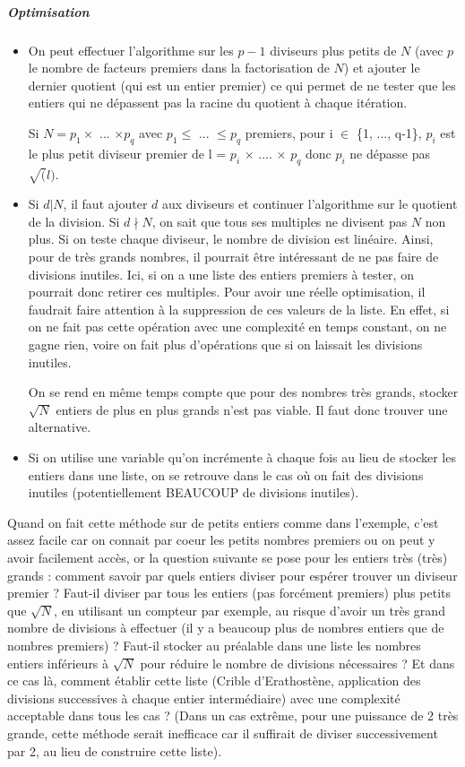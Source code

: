 \documentclass[11pt,a4paper]{article}
\begin{document}
	\subparagraph{Optimisation}
	\begin{itemize}	
		\item On peut effectuer l'algorithme sur les $\mathit{p-1}$ diviseurs plus petits de $\mathit{N}$ (avec $\mathit{p}$ le nombre de facteurs premiers dans la factorisation de $\mathit{N}$) et ajouter le dernier quotient (qui est un entier premier) ce qui permet de ne tester que les entiers qui ne dépassent pas la racine du quotient à chaque itération.
		
		Si $N = p_1 \times$ ... $\times p_q$ avec $p_1 \leq$ ... $\leq p_q$ premiers, pour i $\in$ \{1, ..., q-1\}, $p_i$ est le plus petit diviseur premier de l = $p_i$ $\times$ .... $\times$ $p_q$ donc $p_i$ ne dépasse pas $\sqrt(l)$.
		
		\item Si $\mathit{d|N}$, il faut ajouter $\mathit{d}$ aux diviseurs et continuer l'algorithme sur le quotient de la division. Si $\mathit{d \nmid N}$, on sait que tous ses multiples ne divisent pas $\mathit{N}$ non plus. Si on teste chaque diviseur, le nombre de division est linéaire. Ainsi, pour de très grands nombres, il pourrait être intéressant de ne pas faire de divisions inutiles. Ici, si on a une liste des entiers premiers à tester, on pourrait donc retirer ces multiples. Pour avoir une réelle optimisation, il faudrait faire attention à la suppression de ces valeurs de la liste. En effet, si on ne fait pas cette opération avec une complexité en temps constant, on ne gagne rien, voire on fait plus d'opérations que si on laissait les divisions inutiles. 
		
		On se rend en même temps compte que pour des nombres très grands, stocker $\sqrt{N}$ entiers de plus en plus grands n'est pas viable. Il faut donc trouver une alternative.
		
		\item Si on utilise une variable qu'on incrémente à chaque fois au lieu de stocker les entiers dans une liste, on se retrouve dans le cas où on fait des divisions inutiles (potentiellement BEAUCOUP de divisions inutiles).
	\end{itemize}
	
	
	Quand on fait cette méthode sur de petits entiers comme dans l'exemple, c'est assez facile car on connait par coeur les petits nombres premiers ou on peut y avoir facilement accès, or la question suivante se pose pour les entiers très (très) grands : comment savoir par quels entiers diviser pour espérer trouver un diviseur premier ? Faut-il diviser par tous les entiers (pas forcément premiers) plus petits que $\sqrt{N}$, en utilisant un compteur par exemple, au risque d'avoir un très grand nombre de divisions à effectuer (il y a beaucoup plus de nombres entiers que de nombres premiers) ? Faut-il stocker au préalable dans une liste les nombres entiers inférieurs à $\sqrt{N}$ pour réduire le nombre de divisions nécessaires ? Et dans ce cas là, comment établir cette liste (Crible d'Erathostène, application des divisions successives à chaque entier intermédiaire) avec une complexité acceptable dans tous les cas ? (Dans un cas extrême, pour une puissance de 2 très grande, cette méthode serait inefficace car il suffirait de diviser successivement par 2, au lieu de construire cette liste).
	
\end{document}
